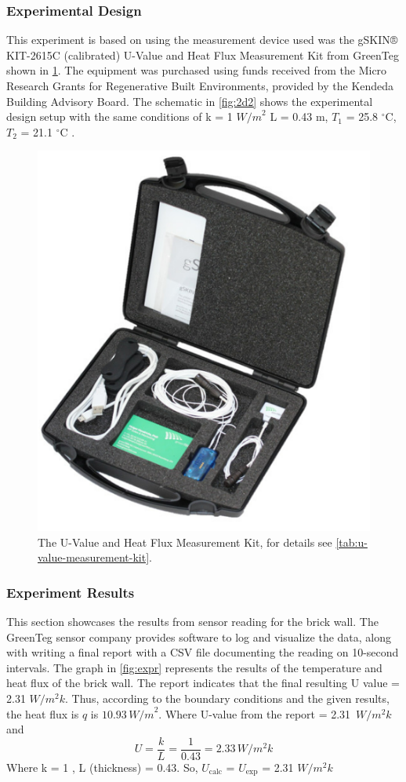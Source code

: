 



 
\subsubsection{Experimental Design}
 This experiment is based on using the measurement device used was the gSKIN® KIT-2615C (calibrated) U-Value and Heat Flux Measurement Kit from GreenTeg  \cite{greenteg} shown in \ref{fig:toolkit}. The equipment was purchased using funds received from the Micro Research Grants for Regenerative Built Environments, provided by the Kendeda Building Advisory Board\cite{kendeda}.
 The schematic in \cref{fig:2d2} shows the experimental design setup with the same conditions of k  = 1 ${W/m}^2$ 
L  = 0.43 m,
$T_1$ = 25.8 $^\circ \text{C}$, 
$T_2$  = 21.1  $^\circ \text{C}$ .

\begin{figure}[tbh]
     \centering
    \includegraphics[width=0.5\linewidth]{Figures/greenteg.png}
     \caption[U-value measurement Kit]{The U-Value and Heat Flux Measurement Kit, for details see \cref{tab:u-value-measurement-kit}.}
   \label{fig:toolkit}
 \end{figure}






\subsubsection{Experiment Results}
This section showcases the results from sensor reading for the brick wall. The GreenTeg sensor company provides software to log and visualize the data, along with writing a final report with a CSV file documenting the reading on 10-second intervals. The graph in \ref{fig:expr} represents the results of the temperature and heat flux of the brick wall. 
The report indicates that the final resulting U value = 2.31 ${W/m^2k}$. Thus, according to the boundary conditions and the given results, the heat flux is \( q \) is \( 10.93\, {W/m}^2 \). 
Where U-value from the report = 2.31\, ${W/m^2k}$ and 
\begin{equation}
    U = \frac{k}{L}
      = \frac{1}{0.43} = 2.33\,  {W/m^2k}
\end{equation}
Where k = 1 , L (thickness) = 0.43. So, \(U_{\text{calc}}\) = \(U_{\text{exp}}\) = 2.31 ${W/m^2k}$ 

